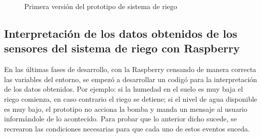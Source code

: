 \begin{figure}[H]
	\begin{center}
	\end{center}
	\label{todo}
	\caption{Primera versi\'on del prototipo de sistema de riego}
\end{figure} 


\subsection{Interpretaci\'{o}n de los datos obtenidos de los sensores del sistema de riego con Raspberry}
En las \'ultimas fases de desarrollo, con la Raspberry censando de manera correcta las variables del entorno, se empez\'o a desarrollar un codig\'o para la interpretaci\'on de los datos obtenidos. Por ejemplo: si la humedad en el suelo es muy baja el riego comienza, en caso contrario el riego se detiene; si el nivel de agua disponible es muy bajo, el prototipo no acciona la bomba y manda un mensaje al usuario inform\'andole de lo acontecido. Para probar que lo anterior dicho sucede, se recrearon las condiciones necesarias para que cada uno de estos eventos suceda.

